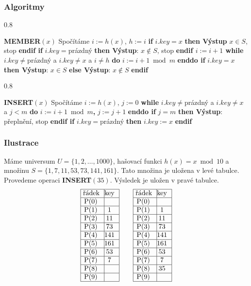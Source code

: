 \documentclass[a4paper,12pt]{article}
\newcommand{\algoritmus}[1]{
  {
  \setlength\fboxrule{0.5pt}

  \begin{boxedminipage}{0.8\textwidth}

 #1
  \end{boxedminipage}

  }
  }
\begin{document}
\subsubsection{Algoritmy}
\algoritmus{
{\bf MEMBER$(x)$}\newline 
Spočítáme $i:=h(x)$, $h:=i$\newline 
{\bf \textsf{if}} $i.key=x$ {\bf \textsf{then} Výstup} $x\in S$, stop {\bf \textsf{endif}\newline 
\textsf{if}} $i.key=$prázdný {\bf \textsf{then} {{\rm Výstup}}}: $x\notin S$, stop {\bf \textsf{endif}\newline 
$i:=i+1$\newline 
\textsf{while}} $i.key\ne$prázdný a $i.key\ne x$ a $i\ne h$ {\bf \textsf{do}} $
i:=i+1\bmod m$ {\bf \textsf{enddo}\newline 
\textsf{if}} $i.key=x$ {\bf \textsf{then} Výstup}: $x\in S$ {\bf \textsf{else} Výstup}: $
x\notin S$ {\bf \textsf{endif}
}
}
\algoritmus{
{\bf INSERT$(x)$}\newline 
Spočítáme $i:=h(x)$, $j:=0$\newline 
{\bf \textsf{while}} $i.key\ne$prázdný a $i.key\ne x$ a $j<m$ {\bf \textsf{do}} $
i:=i+1\bmod m${\bf ,} $j:=j+1$ {\bf \textsf{enddo}\newline 
\textsf{if}} $j=m$ {\bf \textsf{then} Výstup}: přeplnění, stop {\bf \textsf{endif}\newline 
\textsf{if}} $i.key=$prázdný {\bf \textsf{then}} $i.key:=x$ {\bf \textsf{endif}}}


\subsubsection{Ilustrace}
 Máme universum $U=\{1,2,\dots,1000\}$, 
hašovací funk\-ci $h(x)=x\bmod10$ a množinu  
$S=\{1,7,11,53,73,141,161\}$. Tato množina je uložena v levé tabulce. 
Provedeme operaci {\bf INSERT$(35)$}. Výsledek je uložen v 
pravé tabulce.
$$\vbox {\hbox{\vtop{\offinterlineskip\halign{\strut\vrule\ # & \vrule\hfil# \hfil\vrule\cr\noalign{\hrule}řádek & key \hfil\cr\noalign{\hrule}P(0) & \hfill \cr\noalign{\hrule}P(1) & 1 \cr\noalign{\hrule}P(2) & 11 \cr\noalign{\hrule}P(3) & 73 \cr\noalign{\hrule}P(4) & 141 \cr\noalign{\hrule}P(5) & 161 \cr\noalign{\hrule}P(6) & 53 \cr\noalign{\hrule}P(7) & 7 \cr\noalign{\hrule}P(8) & \hfill\cr\noalign{\hrule}P(9) & \hfill \cr\noalign{\hrule}}}\qquad\vtop{\offinterlineskip\halign {\strut\vrule\ # & \vrule \hfil # \hfil \vrule\cr\noalign{\hrule}řádek & key \hfil \cr\noalign{\hrule}P(0) & \hfill \cr\noalign{\hrule}P(1) & 1 \cr\noalign{\hrule}P(2) & 11 \cr\noalign{\hrule}P(3) & 73 \cr\noalign{\hrule}P(4) & 141 \cr\noalign{\hrule}P(5) & 161 \cr\noalign{\hrule}P(6) & 53 \cr\noalign{\hrule}P(7) & 7 \cr\noalign{\hrule}P(8) & 35  \cr\noalign{\hrule}P(9) & \hfill \cr\noalign{\hrule}}}}}$$
\end{document}
